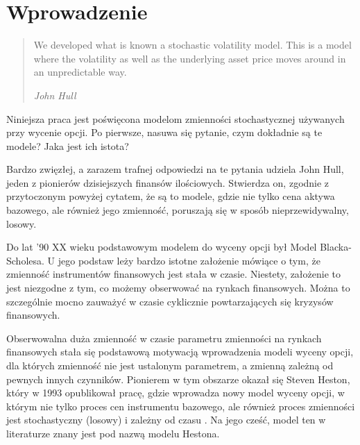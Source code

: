 \documentclass{pracamgr}
\begin{document}
\tableofcontents
 



\chapter{Wprowadzenie}
\label{chap:introduction}
\begin{quote}

  We developed what is known a stochastic volatility model. 
  This is a model where the volatility as well as the 
  underlying asset price moves around in an unpredictable way.

\raggedleft\slshape John Hull 
\end{quote}
Niniejsza praca jest poświęcona modelom zmienności stochastycznej używanych przy wycenie opcji. 
Po pierwsze, nasuwa się pytanie, czym dokładnie są te modele? 
Jaka jest ich istota?

Bardzo zwięzłej, a zarazem trafnej odpowiedzi na te pytania udziela John Hull, 
jeden z pionierów dzisiejszych finansów ilościowych. Stwierdza on, zgodnie z przytoczonym 
powyżej cytatem, że są to modele, gdzie nie tylko cena aktywa bazowego, ale również jego zmienność, 
poruszają się w sposób nieprzewidywalny, losowy. 

Do lat '90 XX wieku podstawowym modelem do wyceny opcji był Model Blacka-Scholesa. U jego podstaw 
leży bardzo istotne założenie mówiące o tym, że zmienność instrumentów finansowych jest stała w czasie. 
Niestety, założenie to jest niezgodne z tym, co możemy obserwować na rynkach finansowych. 
Można to szczególnie mocno zauważyć w czasie cyklicznie powtarzających się kryzysów finansowych.

Obserwowalna duża zmienność w czasie parametru zmienności na rynkach finansowych stała się podstawową motywacją wprowadzenia modeli wyceny
opcji, dla których zmienność nie jest ustalonym parametrem, a zmienną zależną od pewnych innych czynników. 
Pionierem w tym obszarze okazał się Steven Heston, który w 1993 opublikował pracę, gdzie wprowadza
nowy model wyceny opcji, w którym nie tylko proces cen instrumentu bazowego, ale również
proces zmienności jest stochastyczny (losowy) i zależny od czasu \cite{Heston}. Na jego cześć, model ten 
w literaturze znany jest pod nazwą modelu Hestona.
\end{document}
